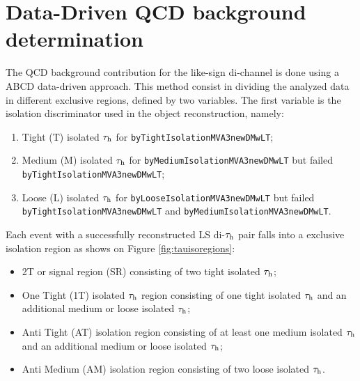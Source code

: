 \section {Data-Driven QCD background determination} \label{sec:bgestimation}
\FloatBarrier


The QCD background contribution for the like-sign di-\hadtau channel is done using a ABCD data-driven approach. This method consist in dividing the analyzed data in different exclusive regions, defined by two variables. The first variable is the \hadtau isolation discriminator used in the object reconstruction, namely:
 	
 	
 	\begin{enumerate}
 		\item Tight (T) isolated $\tau_{\text{h}}$ for \texttt{byTight\-Isolation\-MVA3\-newDMwLT};
 		\item Medium (M) isolated $\tau_{\text{h}}$ for \texttt{byMedium\-Isolation\-MVA3\-newDMwLT} but failed \texttt{byTight\-Isolation\-MVA3\-newDMwLT};
 		\item Loose (L) isolated $\tau_{\text{h}}$  for \texttt{byLoose\-Isolation\-MVA3\-newDMwLT} but failed \texttt{byTight\-Isolation\-MVA3\-newDMwLT} and \texttt{byMedium\-Isolation\-MVA3\-newDMwLT}.
 	\end{enumerate}
 	
Each event with a successfully reconstructed LS di-$\tau_{\text{h}}$ pair falls into a exclusive isolation region as shows on Figure \ref{fig:tauisoregions}:
 	
 	\begin{itemize}
 		\item 2T or signal region (SR) consisting of two tight isolated $\tau_{\text{h}}$;
 		\item One Tight (1T) isolated $\tau_{\text{h}}$ region consisting of one tight isolated $\tau_{\text{h}}$ and an additional medium or loose isolated $\tau_{\text{h}}$;
 		\item  Anti Tight (AT) isolation region consisting of at least one medium isolated $\tau_{\text{h}}$ and an additional medium or loose isolated $\tau_{\text{h}}$;
 		\item  Anti Medium (AM) isolation region consisting of two loose isolated $\tau_{\text{h}}$.
 	\end{itemize}
 
